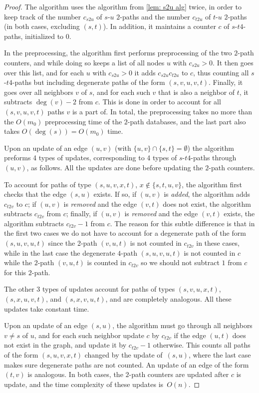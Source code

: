 \documentclass[letter,11pt]{article}
\newcommand{\st}{$s$-$t$\xspace}
\begin{document}
\begin{proof}
	The algorithm uses the algorithm from \cref{lem: s2u alg} twice, in order to keep track of the number $c_{s2u}$ of $s$-$u$ $2$-paths and the number $c_{t2u}$ of $t$-$u$ $2$-paths (in both cases, excluding $(s,t)$).
	In addition, it maintains a counter $c$ of \st $4$-paths, initialized to $0$.
	
	In the preprocessing, the algorithm first performs preprocessing of the two $2$-path counters, and while doing so keeps a list of all nodes $u$ with $c_{s2u}>0$.
	It then goes over this list, and for each $u$ with $c_{s2u}>0$ it adds $c_{s2u}c_{t2u}$ to $c$, thus counting all \st $4$-paths but including degenerate paths of the form $(s,v,u,v,t)$.
	Finally, it goes over all neighbors $v$ of $s$, and for each such $v$ that is also a neighbor of $t$, it subtracts $\deg(v)-2$ from $c$.
	This is done in order to account for all $(s,v,u,v,t)$ paths $v$ is a part of.
	In total, the preprocessing takes no more than the $O(m_0)$ preprocessing time of the $2$-path databases, and the last part also takes $O(\deg(s))=O(m_0)$ time.
	
	Upon an update of an edge $(u,v)$ (with $\{u,v\}\cap\{s,t\}=\emptyset$)
	the algorithm preforms 4 types of updates, corresponding to 4 types of \st $4$-paths through $(u,v)$, as follows.
	All the updates are done before updating the $2$-path counters.
	
	To account for paths of type $(s,u,v,x,t)$, $x\notin\{s,t,u,v\}$, the algorithm first checks that the edge $(s,u)$ exists. If so,
	if $(u,v)$ is \emph{added}, the algorithm adds $c_{t2v}$ to $c$;
	if $(u,v)$ is \emph{removed} and the edge $(v,t)$ does not exist, the algorithm subtracts $c_{t2v}$ from $c$;
	finally, if $(u,v)$ is \emph{removed} and the edge $(v,t)$ exists, the algorithm subtracts $c_{t2v}-1$ from $c$.
	The reason for this subtle difference is that in the first two cases we do not have to account for a degenerate path of the form $(s,u,v,u,t)$ since the 2-path $(v,u,t)$ is not counted in $c_{t2v}$ in these cases, 
	while in the last case the degenerate $4$-path $(s,u,v,u,t)$ is not counted in $c$ while the $2$-path $(v,u,t)$ is counted in $c_{t2v}$ so we should not subtract $1$ from $c$ for this $2$-path.
	
	The other 3 types of updates account for paths of types $(s,v,u,x,t)$, $(s,x,u,v,t)$, and $(s,x,v,u,t)$, and are completely analogous. All these updates take constant time.
	
	Upon an update of an edge $(s,u)$, the algorithm must go through all neighbors $v\neq s$ of $u$, and for each such neighbor update $c$ by $c_{t2v}$ if the edge $(u,t)$ does not exist in the graph, and update it by $c_{t2v}-1$ otherwise.
	This counts all paths of the form $(s,u,v,x,t)$ changed by the update of~$(s,u)$, where the last case makes sure degenerate paths are not counted.
	An update of an edge of the form $(t,v)$ is analogous.
	In both cases, the $2$-path counters are updated after $c$ is update, and the time complexity of these updates is~$O(n)$.
\end{proof}
\end{document}
